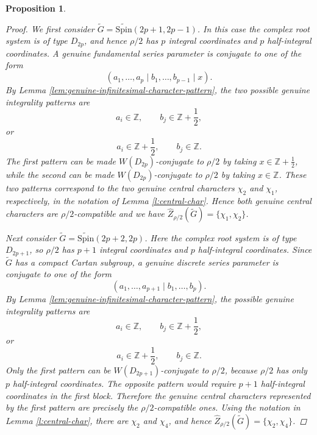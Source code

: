 \documentclass{amsart}
\newcommand{\Spin}{{\mathrm{Spin}}}
\newtheorem{prop}[thm]{Proposition}
\theoremstyle{definition}
\begin{document}
\begin{prop}
\begin{proof}
We first consider $\widetilde G=\widetilde{\Spin}(2p+1,2p-1)$. In this case the complex root system is of type $D_{2p}$, and hence $\rho/2$ has $p$ integral coordinates and $p$ half-integral coordinates. A genuine fundamental series parameter is conjugate to one of the form
\begin{equation*}
(a_1,\ldots,a_p\mid b_1,\ldots,b_{p-1}\mid x).
\end{equation*}
By Lemma \ref{lem:genuine-infinitesimal-character-pattern}, the two possible genuine integrality patterns are
\begin{equation*}
a_i\in\mathbb Z,\qquad b_j\in\mathbb Z+\frac12,
\end{equation*}
or
\begin{equation*}
a_i\in\mathbb Z+\frac12,\qquad b_j\in\mathbb Z.
\end{equation*}
The first pattern can be made $W(D_{2p})$-conjugate to $\rho/2$ by taking $x\in\mathbb Z+\frac12$, while the second can be made $W(D_{2p})$-conjugate to $\rho/2$   by taking $x\in\mathbb Z$. These two patterns correspond to the two genuine central characters $\chi_2$ and $\chi_1$, respectively, in the notation of Lemma \ref{l:central-char}. Hence both genuine central characters are $\rho/2$-compatible and we have  $\widehat Z_{\rho/2}(\widetilde G)=\{\chi_1, \chi_2\}$.

Next consider $\widetilde G=\widetilde{\Spin}(2p+2,2p)$. Here the complex root system is of type $D_{2p+1}$, so $\rho/2$ has $p+1$ integral coordinates and $p$ half-integral coordinates. Since $\widetilde G$ has a compact Cartan subgroup, a genuine discrete series parameter is conjugate to one of the form
\begin{equation*}
(a_1,\ldots,a_{p+1}\mid b_1,\ldots,b_p).
\end{equation*}
By Lemma \ref{lem:genuine-infinitesimal-character-pattern}, the possible genuine integrality patterns are
\begin{equation*}
a_i\in\mathbb Z,\qquad b_j\in\mathbb Z+\frac12,
\end{equation*}
or
\begin{equation*}
a_i\in\mathbb Z+\frac12,\qquad b_j\in\mathbb Z.
\end{equation*}
Only the first pattern can be $W(D_{2p+1})$-conjugate to $\rho/2$, because $\rho/2$ has only $p$ half-integral coordinates. The opposite pattern would require $p+1$ half-integral coordinates in the first block. Therefore the genuine central characters represented by the first pattern are precisely the $\rho/2$-compatible ones. Using the notation in Lemma \ref{l:central-char}, there are $\chi_2$ and $\chi_4$, and hence
 $\widehat Z_{\rho/2}(\widetilde G)=\{\chi_2, \chi_4\}$.



\end{proof}
\end{prop}
\end{document}
